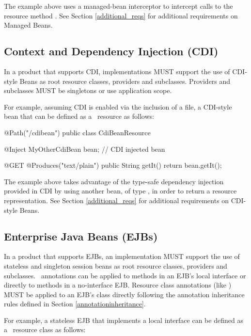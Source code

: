 The example above uses a managed-bean interceptor to intercept calls to the resource method . See Section \ref{additional_reqs} for additional requirements on Managed Beans.

\subsection{Context and Dependency Injection (CDI)}
\label{cdi}
In a product that supports CDI, implementations MUST support the use of CDI-style Beans as root resource classes, providers and  subclasses. Providers and  subclasses MUST be singletons or use application scope. 

For example, assuming CDI is enabled via the inclusion of a  file, a CDI-style bean that can be defined as a \jaxrs\ resource as follows:

\begin{listing}{1}
@Path("/cdibean")
public class CdiBeanResource {

	@Inject MyOtherCdiBean bean;		// CDI injected bean

    @GET
    @Produces("text/plain")
    public String getIt() {
        return bean.getIt();
    }
}
\end{listing}

The example above takes advantage of the type-safe dependency injection provided in CDI by using another bean, of type , in order to return a resource representation. See Section \ref{additional_reqs} for additional requirements on CDI-style Beans.

\subsection{Enterprise Java Beans (EJBs)}
\label{ejbs}

In a product that supports EJBs, an implementation MUST support the use of stateless and singleton session beans as root resource classes, providers and  subclasses. 
\jaxrs\ annotations can be applied to methods in an EJB's local interface or directly to methods in a no-interface EJB. Resource class annotations (like \Path) MUST be applied to an EJB's class directly following the annotation inheritance rules defined in Section \ref{annotationinheritance}.

For example, a stateless EJB that implements a local interface can be defined as a \jaxrs\ resource class as follows:

